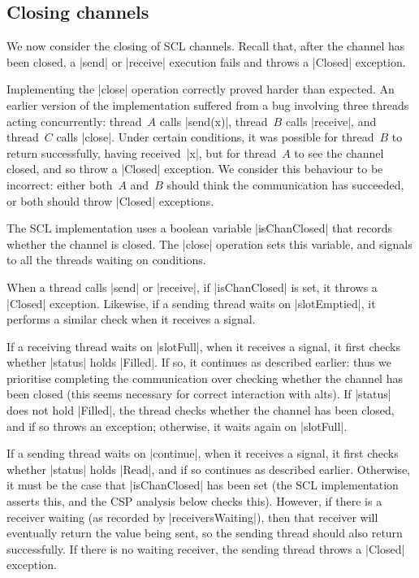 \subsection{Closing channels}
\label{sec:syncchan-closing}

\inlineScala

We now consider the closing of SCL channels.  Recall that, after the channel
has been closed, a |send| or |receive| execution fails and throws a |Closed|
exception.

Implementing the |close| operation correctly proved harder than expected.  An
earlier version of the implementation suffered from a bug involving three
threads acting concurrently: thread~$A$ calls |send(x)|, thread~$B$ calls
|receive|, and thread~$C$ calls |close|.  Under certain conditions, it was
possible for thread~$B$ to return successfully, having received~|x|, but for
thread~$A$ to see the channel closed, and so throw a |Closed| exception.  We
consider this behaviour to be incorrect: either both~$A$ and~$B$ should think
the communication has succeeded, or both should throw |Closed| exceptions.


The SCL implementation uses a boolean variable |isChanClosed| that records
whether the channel is closed.  The |close| operation sets this variable, and
signals to all the threads waiting on conditions.

When a thread calls |send| or |receive|, if |isChanClosed| is set, it throws a
|Closed| exception.  Likewise, if a sending thread waits on |slotEmptied|, it
performs a similar check when it receives a signal.  

If a receiving thread waits on |slotFull|, when it receives a signal, it first
checks whether |status| holds |Filled|.  If so, it continues as described
earlier: thus we prioritise completing the communication over checking whether
the channel has been closed (this seems necessary for correct interaction with
alts).
If |status| does not hold |Filled|, the thread checks whether the channel has
been closed, and if so throws an exception; otherwise, it waits again on
|slotFull|.

If a sending thread waits on |continue|, when it receives a signal, it first
checks whether |status| holds |Read|, and if so continues as described
earlier.  Otherwise, it must be the case that |isChanClosed| has been set (the
SCL implementation asserts this, and the CSP analysis below checks this).
However, if there is a receiver waiting (as recorded by |receiversWaiting|),
then that receiver will eventually return the value being sent, so the sending
thread should also return successfully.  If there is no waiting receiver, the
sending thread throws a |Closed| exception.

